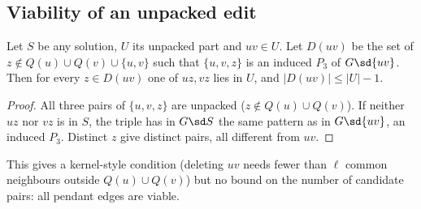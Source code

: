 \subsection{Viability of an unpacked edit}
\begin{lemma}\label{lem:viab}
Let $S$ be any solution, $U$ its unpacked part and $uv\in U$. Let $D(uv)$ be the set of $z\notin Q(u)\cup Q(v)\cup\{u,v\}$ such that $\{u,v,z\}$ is an induced $P_3$ of $G\sd\{uv\}$. Then for every $z\in D(uv)$ one of $uz,vz$ lies in $U$, and $|D(uv)|\le|U|-1$.
\end{lemma}
\begin{proof}
All three pairs of $\{u,v,z\}$ are unpacked ($z\notin Q(u)\cup Q(v)$). If neither $uz$ nor $vz$ is in $S$, the triple has in $G\sd S$ the same pattern as in $G\sd\{uv\}$, an induced $P_3$. Distinct $z$ give distinct pairs, all different from $uv$.
\end{proof}
This gives a kernel-style condition (deleting $uv$ needs fewer than $\ell$ common neighbours outside $Q(u)\cup Q(v)$) but no bound on the number of candidate pairs: all pendant edges are viable.

